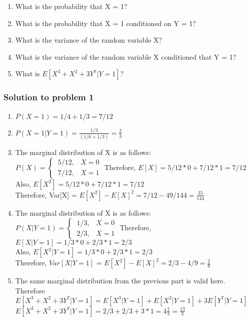 \documentclass[12pt]{article}%
\begin{document}
\begin{enumerate}
    \item What is the probability that X = 1?
    \item What is the probability that X = 1 conditioned on Y = 1?
    \item What is the variance of the random variable X?
    \item What is the variance of the random variable X conditioned that Y = 1?
    \item What is $E[X^3 + X^2 + 3Y^7|Y = 1]$? 
\end{enumerate}

\subsubsection{Solution to problem 1}

\begin{enumerate}
    \item $P(X=1) =  1/4 + 1/3 = 7/12$
    \item $P(X=1|Y=1) = \frac{1/3}{(1/6 + 1/3)} = \frac{2}{3}$
    \item The marginal distribution of X is as follows:\\
            $P(X)= 
            \begin{cases}
            \ 5/12 ,&  X = 0\\
            \ 7/12,              & X = 1
            \end{cases}$
            \newline
            Therefore, $E[X] = 5/12 * 0 + 7/12 * 1 = 7/12$\\
            Also, $E[X^2] = 5/12 * 0 + 7/12 * 1 = 7/12$\\
            Therefore, Var[X] = $E[X^2] - E[X]^2 = 7/12 - 49/144 = \frac{35}{144}$
            
    \item The marginal distribution of X is as follows:\\
            $P(X|Y=1)= 
            \begin{cases}
            \ 1/3 ,&  X = 0\\
            \ 2/3 ,& X = 1
            \end{cases}$
            \newline
            Therefore, $E[X|Y=1] = 1/3 * 0 + 2/3 * 1 = 2/3$\\
            Also, $E[X^2|Y=1] = 1/3 * 0 + 2/3 * 1 = 2/3$\\
            Therefore, $Var[X|Y=1]$ = $E[X^2] - E[X]^2 = 2/3 - 4/9 = \frac{2}{9}$
    \item The same marginal distribution from the previous part is valid here. Therefore\\
    $E[X^3 + X^2 + 3Y^7|Y = 1] = E[X^3|Y=1] + E[X^2|Y=1] + 3E[Y^7|Y=1]$\\
    $E[X^3 + X^2 + 3Y^7|Y = 1] = 2/3 + 2/3 + 3*1 = 4\frac{1}{3} = \frac{13}{3}$
\end{enumerate}
\end{document}
